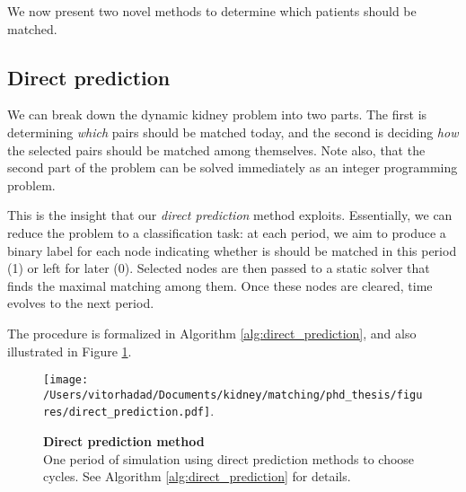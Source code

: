 We now present two novel methods to determine which patients should be matched.

\subsection{Direct prediction} \label{subsec:direct_prediction}

We can break down the dynamic kidney problem into two parts. The first is determining \emph{which} pairs should be matched today, and the second is deciding \emph{how} the selected pairs should be matched among themselves. Note also, that the second part of the problem can be solved immediately as an integer programming problem. 

This is the insight that our \emph{direct prediction} method exploits. Essentially, we can reduce the problem to a classification task: at each period, we aim to produce a binary label for each node indicating whether is should be matched in this period (1) or left for later (0). Selected nodes are then passed to a static solver that finds the maximal matching among them. Once these nodes are cleared, time evolves to the next period. 

The procedure is formalized in Algorithm \ref{alg:direct_prediction}, and also illustrated in Figure \ref{fig:direct_prediction}.

\begin{figure}[htbp]
\centering
\texttt{[image: /Users/vitorhadad/Documents/kidney/matching/phd\_thesis/figures/direct\_prediction.pdf]}.
\caption[Direct prediction method]{\textbf{Direct prediction method} \\ One period of simulation using direct prediction methods to choose cycles. See Algorithm \ref{alg:direct_prediction} for details.}
\label{fig:direct_prediction}
\end{figure}


